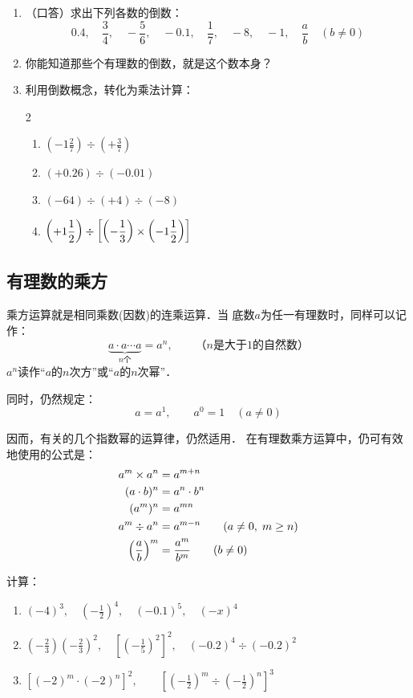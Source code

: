 \begin{ex}
 \begin{enumerate}
     \item （口答）求出下列各数的倒数：
     \[0.4,\quad \frac{3}{4},\quad -\frac{5}{6},\quad -0.1,\quad \frac{1}{7},\quad -8,\quad -1,\quad \frac{a}{b}\quad (b\ne 0)  \]
\item 你能知道那些个有理数的倒数，就是这个数本身？
\item 利用倒数概念，转化为乘法计算：
\begin{multicols}{2}
\begin{enumerate}
    \item $\left(-1\frac{2}{7}\right)\div \left(+\frac{3}{7}\right)$
    \item $(+0.26)\div (-0.01)$
    \item $(-64)\div (+4)\div (-8)$
    \item $\left(+1\dfrac{1}{2}\right)\div \left[\left(-\dfrac{1}{3}\right)\times \left(-1\dfrac{1}{2}\right)\right]$
\end{enumerate}
\end{multicols}
    \end{enumerate}   
\end{ex}

\subsection{有理数的乘方}
  乘方运算就是相同乘数(因数)的连乘运算．当
底数$a$为任一有理数时，同样可以记作：
\[\underbrace{a\cdot a\cdots a}_{n\text{个}} =a^n,\qquad \text{（$n$是大于1的自然数）}  \]
$a^n$读作“$a$的$n$次方”或“$a$的$n$次幂”．

同时，仍然规定：
\[a=a^1,\qquad a^0=1\quad (a\ne 0) \]

因而，有关的几个指数幂的运算律，仍然适用．
在有理数乘方运算中，仍可有效地使用的公式是：
\[\begin{split}
    a^m\times a^n &=a^{m+n}\\
    (a\cdot b)^n&=a^n\cdot b^n\\
    (a^m)^n&=a^{mn}\\
    a^m\div a^n&=a^{m-n}\qquad (a\ne 0,\; m\ge n)\\
\left(\dfrac{a}{b}\right)^m&=\dfrac{a^m}{b^m}\qquad (b\ne 0)
\end{split}\]



\begin{example}
    计算：
\begin{enumerate}
    \item $(-4)^3,\quad \left(-\frac{1}{2}\right)^4,\quad (-0.1)^5,\quad (-x)^4$
    \item $\left(-\frac{2}{3}\right)\left(-\frac{2}{3}\right)^2,\quad \left[\left(-\frac{1}{5}\right)^2\right]^2,\quad (-0.2)^4\div (-0.2)^2$
    \item $\left[(-2)^m\cdot (-2)^n\right]^2,\qquad \left[\left(-\frac{1}{2}\right)^m\div \left(-\frac{1}{2}\right)^n\right]^3$
\end{enumerate}
\end{example}

